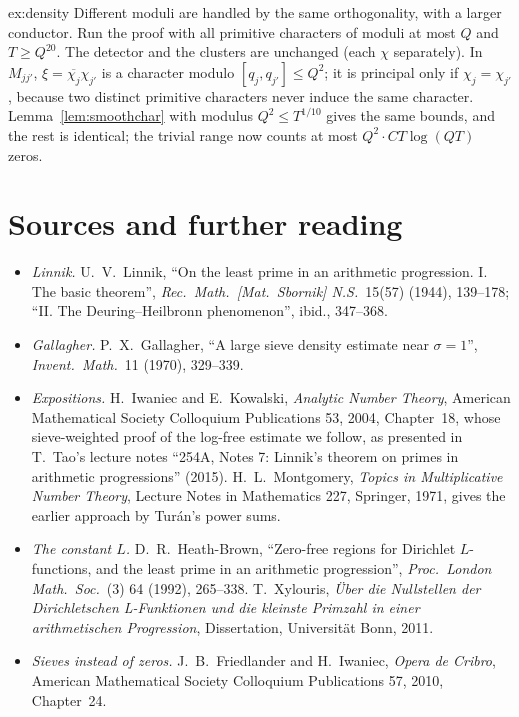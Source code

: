 \begin{solution}{ex:density}
\idea Different moduli are handled by the same orthogonality, with a larger conductor.
\writeup Run the proof with all primitive characters of moduli at most $Q$ and $T\ge Q^{20}$. The detector and the clusters are unchanged (each $\chi$ separately). In $M_{jj'}$, $\xi=\overline{\chi_j}\chi_{j'}$ is a character modulo $[q_j,q_{j'}]\le Q^2$; it is principal only if $\chi_j=\chi_{j'}$, because two distinct primitive characters never induce the same character. Lemma~\ref{lem:smoothchar} with modulus $Q^2\le T^{1/10}$ gives the same bounds, and the rest is identical; the trivial range now counts at most $Q^2\cdot CT\log(QT)$ zeros.
\end{solution}

\section*{Sources and further reading}

\begin{itemize}
\item \emph{Linnik.} U.~V.~Linnik, ``On the least prime in an arithmetic progression. I. The basic theorem'', \emph{Rec.\ Math.\ [Mat.\ Sbornik] N.S.}\ 15(57) (1944), 139--178; ``II. The Deuring--Heilbronn phenomenon'', ibid., 347--368.
\item \emph{Gallagher.} P.~X.~Gallagher, ``A large sieve density estimate near $\sigma=1$'', \emph{Invent.\ Math.}\ 11 (1970), 329--339.
\item \emph{Expositions.} H.~Iwaniec and E.~Kowalski, \emph{Analytic Number Theory}, American Mathematical Society Colloquium Publications 53, 2004, Chapter~18, whose sieve-weighted proof of the log-free estimate we follow, as presented in T.~Tao's lecture notes ``254A, Notes 7: Linnik's theorem on primes in arithmetic progressions'' (2015). H.~L.~Montgomery, \emph{Topics in Multiplicative Number Theory}, Lecture Notes in Mathematics 227, Springer, 1971, gives the earlier approach by Turán's power sums.
\item \emph{The constant $L$.} D.~R.~Heath-Brown, ``Zero-free regions for Dirichlet $L$-functions, and the least prime in an arithmetic progression'', \emph{Proc.\ London Math.\ Soc.}\ (3) 64 (1992), 265--338. T.~Xylouris, \emph{Über die Nullstellen der Dirichletschen L-Funktionen und die kleinste Primzahl in einer arithmetischen Progression}, Dissertation, Universität Bonn, 2011.
\item \emph{Sieves instead of zeros.} J.~B.~Friedlander and H.~Iwaniec, \emph{Opera de Cribro}, American Mathematical Society Colloquium Publications 57, 2010, Chapter~24.
\end{itemize}

